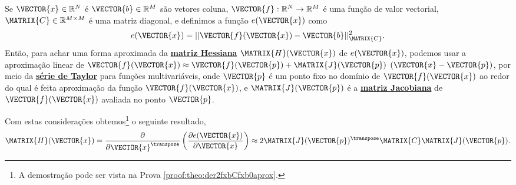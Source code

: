 \begin{theorem}\label{theo:der2fxbCfxb0aprox}
Se 
$\VECTOR{x}\in \mathbb{R}^N$ é  
$\VECTOR{b}\in \mathbb{R}^M$ são vetores coluna,  
$\VECTOR{f}: \mathbb{R}^{N}\rightarrow \mathbb{R}^{M}$ é uma função de valor vectorial,
$\MATRIX{C} \in \mathbb{R}^{M\times M}$ é uma matriz diagonal, e 
definimos a função $e(\VECTOR{x})$ como
\begin{equation}
e(\VECTOR{x})= ||\VECTOR{f}(\VECTOR{x})-\VECTOR{b}||_{\MATRIX{C}}^2.
\end{equation}
Então, para achar uma forma aproximada da \hyperref[def:hessian]{\textbf{matriz Hessiana}} $\MATRIX{H}(\VECTOR{x})$ de $e(\VECTOR{x})$, 
podemos usar a aproximação linear de 
$\VECTOR{f}(\VECTOR{x})\approx \VECTOR{f}(\VECTOR{p}) + \MATRIX{J}(\VECTOR{p})$ $\left(\VECTOR{x}-\VECTOR{p}\right)$, 
por meio da \hyperref[def:taylor]{\textbf{série de Taylor}} 
para funções multivariáveis,
onde $\VECTOR{p}$ é um ponto fixo no domínio de $\VECTOR{f}(\VECTOR{x})$ ao redor do qual é feita  aproximação
da função $\VECTOR{f}(\VECTOR{x})$,
e $\MATRIX{J}(\VECTOR{p})$ é a \hyperref[def:jacobian]{\textbf{matriz Jacobiana}} de $\VECTOR{f}(\VECTOR{x})$ avaliada no ponto $\VECTOR{p}$.

Com estas considerações obtemos\footnote{A demostração pode ser vista na Prova \ref{proof:theo:der2fxbCfxb0aprox}.} o seguinte resultado,
\begin{equation}
\MATRIX{H}(\VECTOR{x}) = \frac{\partial}{\partial \VECTOR{x}^{\transpose}}\left(  
\frac{\partial e(\VECTOR{x}) }{\partial \VECTOR{x}} \right) \approx 
2 \MATRIX{J}(\VECTOR{p})^{\transpose}\MATRIX{C} \MATRIX{J}(\VECTOR{p}).
\end{equation}


\end{theorem}
